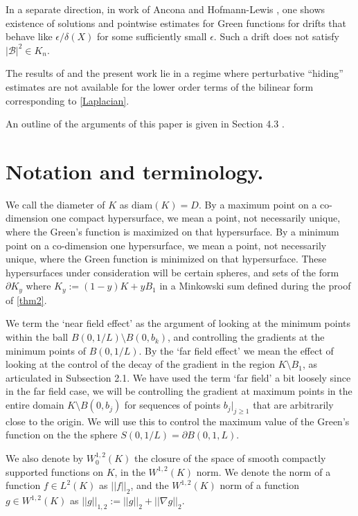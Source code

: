 \documentclass{article}
\theoremstyle{plain}
\theoremstyle{definition}
\theoremstyle{plain}
\newcommand{\B}{\mathcal{B}}
\begin{document}
 In a separate direction, in work of Ancona and Hofmann-Lewis \cite{An86,Singdr}, one shows existence of solutions and pointwise estimates for Green functions for drifts that behave like $\epsilon/\delta(X)$ for some sufficiently small $\epsilon$. Such a drift does not satisfy $|\B|^{2}\in K_n$.

The results of \cite{Pat25} and the present work lie in a regime where perturbative “hiding” estimates are not available for the lower order terms of the bilinear form corresponding to \cref{Laplacian}.

An outline of the arguments of this paper is given in Section 4.3 .



\section{Notation and terminology.}

We call the diameter of $K$ as $\text{diam}(K)=D$. By a maximum point on a co-dimension one compact hypersurface, we mean a point, not necessarily unique, where the Green's function is maximized on that hypersurface. By a minimum point on a co-dimension one hypersurface, we mean a point, not necessarily unique, where the Green function is minimized on that hypersurface. These hypersurfaces under consideration will be certain spheres, and sets of the form $\partial K_y$ where $K_y:= (1-y)K +yB_1$ in a Minkowski sum defined during the proof of \cref{thm2}.

We term the `near field effect' as the argument of looking at the minimum points within the ball $B(0, 1/L)\setminus B(0, b_k)$, and controlling the gradients at the minimum points of $B(0,1/L)$. By the `far field effect' we mean the effect of looking at the control of the decay of the gradient in the region $K\setminus B_1$, as articulated in Subsection 2.1. We have used the term `far field' a bit loosely since in the far field case, we will be controlling the gradient at maximum points in the entire domain $K\setminus B(0,b_j)$ for sequences of points $b_j|_{j\geq 1}$ that are arbitrarily close to the origin. We will use this to control the maximum value of the Green's function on the the sphere $S(0,1/L)=\partial B(0,1,L)$. 

We also denote by $W^{1,2}_{0}(K)$ the closure of the space of smooth compactly supported functions on $K$, in the $W^{1,2}(K)$ norm. We denote the norm of a function $f\in L^{2}(K)$ as $||f||_2$, and the $W^{1,2}(K)$ norm of a function $g\in W^{1,2}(K)$ as $||g||_{1,2}:=||g||_2 +||\nabla g||_2$.
 
\end{document}
